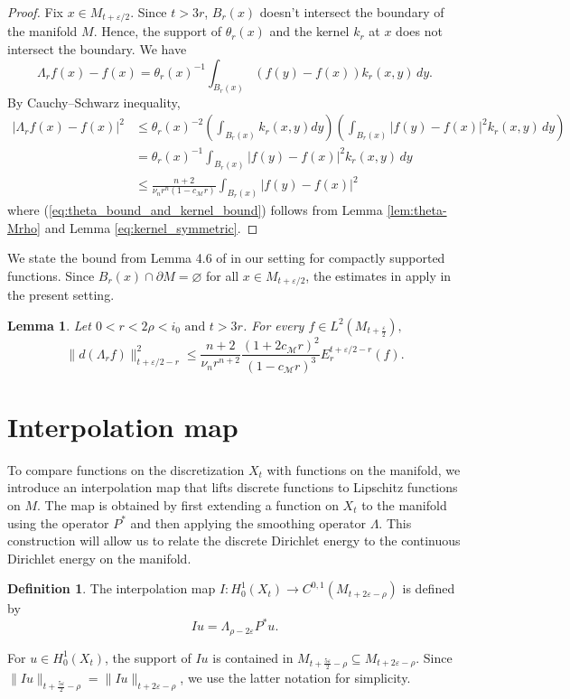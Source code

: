 \documentclass[10 pt, reqno]{amsart}
\newtheorem{lemma}[theorem]{Lemma}
\theoremstyle{definition}
\newtheorem{definition}{Definition}
\numberwithin{equation}{section}
\newcommand{\MMM}{\mathcal{M}}
\newcommand{\lbtheta}{(1-c_\MMM r)}
\begin{document}
\begin{proof}
Fix $x\in M_{t+\varepsilon/2}$.  Since $t>3r$, $B_r(x)$ doesn't intersect the boundary of the manifold $M$. Hence, the support of $\theta_r(x)$ and the kernel $k_r$ at $x$ does not intersect the boundary. We have
\[
\Lambda_r f(x)-f(x)
=
\theta_r(x)^{-1}
\int_{B_r(x)}(f(y)-f(x))k_r(x,y)\,dy.
\]
By Cauchy--Schwarz inequality,
\begin{align}
 |\Lambda_r f(x)-f(x)|^2
&\le \theta_r(x)^{-2}\left(\int_{B_r(x)}k_r(x,y)dy\right)\left(\int_{B_r(x)} |f(y)-f(x)|^2 k_r(x,y)\,dy\right) \nonumber\\
&=\theta_r(x)^{-1}
\int_{B_r(x)}|f(y)-f(x)|^2 k_r(x,y)\,dy \nonumber\\
&\le \frac{n+2}{\nu_nr^{n}\lbtheta }\int_{B_r(x)}|f(y)-f(x)|^2 \label{eq:theta_bound_and_kernel_bound}
\end{align}
where (\ref{eq:theta_bound_and_kernel_bound}) follows from Lemma \ref{lem:theta-Mrho} and Lemma \ref{eq:kernel_symmetric}.
\end{proof}
We state the bound from Lemma 4.6 of \cite{MaityBhattacharya2026} in our setting for compactly supported functions. Since $B_r(x)\cap\partial M=\varnothing$ for all $x\in M_{t+\varepsilon/2}$, the estimates in \cite{MaityBhattacharya2026} apply in the present setting.
\begin{lemma} \label{lem:upper bound on dlambda}
Let $0<r<2\rho<i_0 \text{ and } t>3r$. For every $f\in L^2(M_{t+\frac{\varepsilon}{2}}),$
\[\|d(\Lambda_rf)\|^2_{t+\varepsilon/2-r}\le \frac{n+2}{\nu_{n}r^{n+2}} \frac{(1+ 2c_\MMM r)^2}{(1-c_\MMM r)^3
     }E_r^{t+\varepsilon/2-r}(f).\]
\end{lemma}


\section{Interpolation map}


To compare functions on the discretization $X_t$ with functions on the manifold, we introduce an interpolation map that lifts discrete functions to Lipschitz functions on $M$. The map is obtained by first extending a function on $X_t$ to the manifold using the operator $P^*$ and then applying the smoothing operator $\Lambda$. This construction will allow us to relate the discrete Dirichlet energy to the continuous Dirichlet energy on the manifold.
\begin{definition}
The interpolation map $I:H^1_0(X_t)\rightarrow C^{0,1}(M_{t+2\varepsilon-\rho})$
is defined by
\[
Iu=\Lambda_{\rho-2\varepsilon}P^*u.
\]
\end{definition}
For $u\in H^1_0(X_t)$, the support of $Iu$ is contained in 
$M_{t+\frac{5\varepsilon}{2}-\rho}\subseteq M_{t+2\varepsilon-\rho}$. Since $\|Iu\|_{t+\frac{5\varepsilon}{2}-\rho}=\|Iu\|_{t+2\varepsilon-\rho}$, 
we use the latter notation for simplicity.
\end{document}
